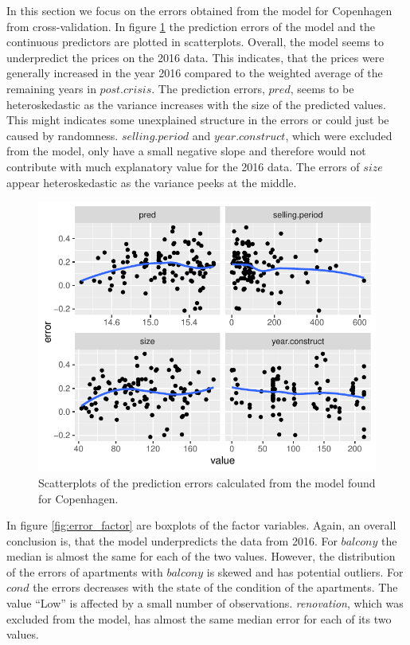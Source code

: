 In this section we focus on the errors obtained from the model for Copenhagen from cross-validation.
In figure \ref{fig:error_cont} the prediction errors of the model and the continuous predictors are plotted in scatterplots. 
Overall, the model seems to underpredict the prices on the 2016 data. 
This indicates, that the prices were generally increased in the year 2016 compared to the weighted average of the remaining years in $post.crisis$. 
The prediction errors, $pred$, seems to be heteroskedastic as the variance increases with the size of the predicted values. 
This might indicates some unexplained structure in the errors or could just be caused by randomness. 
$selling.period$ and $year.construct$, which were excluded from the model, only have a small negative slope and therefore would not contribute with much explanatory value for the 2016 data.
The errors of $size$ appear heteroskedastic as the variance peeks at the middle. 
\begin{figure}[H]
        \centering
      \includegraphics[width = 0.7 \textwidth]{figures/Nanna/errors_continuous.pdf}
      \caption{Scatterplots of the prediction errors calculated from the model found for Copenhagen. }
      \label{fig:error_cont}
\end{figure}
In figure \ref{fig:error_factor} are boxplots of the factor variables. 
Again, an overall conclusion is, that the model underpredicts the data from 2016.
For $balcony$ the median is almost the same for each of the two values.
However, the distribution of the errors of apartments with $balcony$ is skewed and has potential outliers. 
For $cond$ the errors decreases with the state of the condition of the apartments.
The value ``Low'' is affected by a small number of observations. 
\textit{renovation}, which was excluded from the model, has almost the same median error for each of its two values. 
